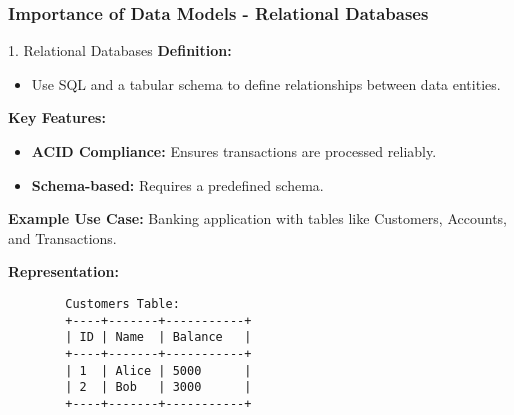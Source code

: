 \documentclass[aspectratio=169]{beamer}
\begin{document}
\begin{frame}[fragile]
    \frametitle{Importance of Data Models - Relational Databases}
    \begin{block}{1. Relational Databases}
        \textbf{Definition:}
        \begin{itemize}
            \item Use SQL and a tabular schema to define relationships between data entities.
        \end{itemize}

        \textbf{Key Features:}
        \begin{itemize}
            \item \textbf{ACID Compliance:} Ensures transactions are processed reliably.
            \item \textbf{Schema-based:} Requires a predefined schema.
        \end{itemize}

        \textbf{Example Use Case:} 
        Banking application with tables like Customers, Accounts, and Transactions.
        
        \textbf{Representation:}
        \begin{lstlisting}
        Customers Table:
        +----+-------+-----------+
        | ID | Name  | Balance   |
        +----+-------+-----------+
        | 1  | Alice | 5000      |
        | 2  | Bob   | 3000      |
        +----+-------+-----------+
        \end{lstlisting}
    \end{block}
\end{frame}
\end{document}
